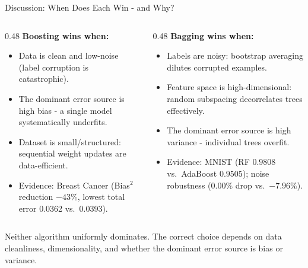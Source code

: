 \documentclass[aspectratio=169,10pt]{beamer}
\begin{document}
\begin{frame}{Discussion: When Does Each Win - and Why?}
  \begin{columns}[T]
    \begin{column}{0.48\textwidth}
      {\color{lectureblue}\textbf{Boosting wins when:}}
      \begin{itemize}\small
        \item Data is clean and low-noise (label corruption is catastrophic).
        \item The dominant error source is high bias - a single model systematically underfits.
        \item Dataset is small/structured: sequential weight updates are data-efficient.
        \item Evidence: Breast Cancer (Bias$^2$ reduction $-43\%$, lowest total error 0.0362 vs.\ 0.0393).
      \end{itemize}
    \end{column}
    \begin{column}{0.48\textwidth}
      {\color{lectureblue}\textbf{Bagging wins when:}}
      \begin{itemize}\small
        \item Labels are noisy: bootstrap averaging dilutes corrupted examples.
        \item Feature space is high-dimensional: random subspacing decorrelates trees effectively.
        \item The dominant error source is high variance - individual trees overfit.
        \item Evidence: MNIST (RF $0.9808$ vs.\ AdaBoost $0.9505$); noise robustness ($0.00\%$ drop vs.\ $-7.96\%$).
      \end{itemize}
    \end{column}
  \end{columns}
  \vspace{10pt}
  \small\centering
  Neither algorithm uniformly dominates. The correct choice depends on data cleanliness, dimensionality, and whether the dominant error source is bias or variance.
\end{frame}
\end{document}
